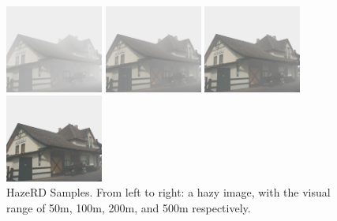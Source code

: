\begin{figure}[htb]
\begin{minipage}[b]{0.24\linewidth}
  \centering
  \centerline{\includegraphics[width=3.2cm]{hazerd/dataset/IMG_8612_50}}
\end{minipage}
%
\hfill
\begin{minipage}[b]{0.24\linewidth}
  \centering
  \centerline{\includegraphics[width=3.2cm]{hazerd/dataset/IMG_8612_100}}
\end{minipage}
\hfill
\begin{minipage}[b]{0.24\linewidth}
  \centering
  \centerline{\includegraphics[width=3.2cm]{hazerd/dataset/IMG_8612_200}}
\end{minipage}
\begin{minipage}[b]{0.24\linewidth}
  \centering
  \centerline{\includegraphics[width=3.2cm]{hazerd/dataset/IMG_8612_500}}
\end{minipage}
\caption{HazeRD Samples. From left to right: a hazy image, with the visual range of 50m, 100m, 200m, and 500m respectively.}
\label{fig:3.example_dataset}
\end{figure}
